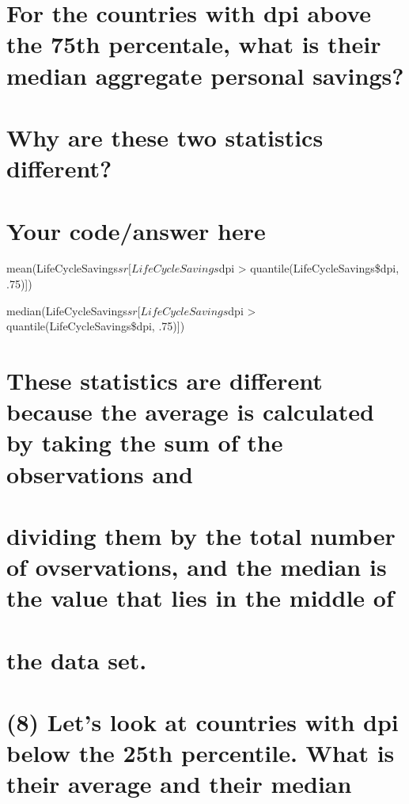 \documentclass[]{article}
\begin{document}
\section{For the countries with dpi above the 75th percentale, what is
their median aggregate personal
savings?}\label{for-the-countries-with-dpi-above-the-75th-percentale-what-is-their-median-aggregate-personal-savings}

\section{Why are these two statistics
different?}\label{why-are-these-two-statistics-different}

\section{Your code/answer here}\label{your-codeanswer-here-6}

mean(LifeCycleSavings\(sr[LifeCycleSavings\)dpi \textgreater{}
quantile(LifeCycleSavings\$dpi, .75){]})

median(LifeCycleSavings\(sr[LifeCycleSavings\)dpi \textgreater{}
quantile(LifeCycleSavings\$dpi, .75){]})

\section{These statistics are different because the average is
calculated by taking the sum of the observations
and}\label{these-statistics-are-different-because-the-average-is-calculated-by-taking-the-sum-of-the-observations-and}

\section{dividing them by the total number of ovservations, and the
median is the value that lies in the middle
of}\label{dividing-them-by-the-total-number-of-ovservations-and-the-median-is-the-value-that-lies-in-the-middle-of}

\section{the data set.}\label{the-data-set.}

\section{(8) Let's look at countries with dpi below the 25th percentile.
What is their average and their
median}\label{lets-look-at-countries-with-dpi-below-the-25th-percentile.-what-is-their-average-and-their-median}
\end{document}
